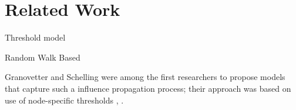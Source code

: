 
\section{Related Work}\label{sec:related-work}
Threshold model

Random Walk Based 

\cite{backstrom2011supervised}

\cite{elo1978rating}

\cite{kwak2010twitter}

\cite{welch2011topical}

\cite{wu2011says}

\cite{yang2011like}

\cite{java2007we}



Granovetter and Schelling were among the first researchers to propose models that capture such a influence propagation process; their approach was based on use of node-specific thresholds \cite{snowball1}, \cite{snowball2}. 